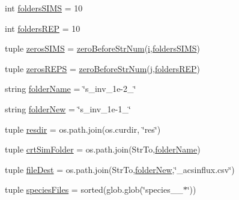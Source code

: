 \begin{DoxyCompactItemize}
\item 
int \hyperlink{namespacereset_for_new_simulations_a60b4005683b2bced2f3e0b22a66abd47}{folders\-S\-I\-M\-S} = 10
\item 
int \hyperlink{namespacereset_for_new_simulations_a3869e711bac998c005313abd611c6158}{folders\-R\-E\-P} = 10
\item 
tuple \hyperlink{namespacereset_for_new_simulations_a067f416fc59f243e38a0b8a40627979b}{zeros\-S\-I\-M\-S} = \hyperlink{namespacereset_for_new_simulations_aba1c55fe18d1a0b31b346994a7a96628}{zero\-Before\-Str\-Num}(\hyperlink{start_8m_ad3efca1ea6e3333daf30719ee0501862}{i},\hyperlink{namespacereset_for_new_simulations_a60b4005683b2bced2f3e0b22a66abd47}{folders\-S\-I\-M\-S})
\item 
tuple \hyperlink{namespacereset_for_new_simulations_a9f88ef39633f68b28f6b0e96d5ebb34c}{zeros\-R\-E\-P\-S} = \hyperlink{namespacereset_for_new_simulations_aba1c55fe18d1a0b31b346994a7a96628}{zero\-Before\-Str\-Num}(\hyperlink{inizializzatore___a_c_s_8m_ac86694252f8dfdb19aaeadc4b7c342c6}{j},\hyperlink{namespacereset_for_new_simulations_a3869e711bac998c005313abd611c6158}{folders\-R\-E\-P})
\item 
string \hyperlink{namespacereset_for_new_simulations_af9fbda1c8e6d13404f0224a5b3ef16fe}{folder\-Name} = \char`\"{}s\-\_\-inv\-\_\-1e-\/2\-\_\-\char`\"{}
\item 
string \hyperlink{namespacereset_for_new_simulations_adfad2b3e8459d644a442c254865c564b}{folder\-New} = \char`\"{}s\-\_\-inv\-\_\-1e-\/1\-\_\-\char`\"{}
\item 
tuple \hyperlink{namespacereset_for_new_simulations_addd72b08bf24570a2a851808a0b21949}{resdir} = os.\-path.\-join(os.\-curdir, \char`\"{}res\char`\"{})
\item 
tuple \hyperlink{namespacereset_for_new_simulations_ad71f20889e7a6394d3c15e5e9381394d}{crt\-Sim\-Folder} = os.\-path.\-join(Str\-To,\hyperlink{namespacereset_for_new_simulations_af9fbda1c8e6d13404f0224a5b3ef16fe}{folder\-Name})
\item 
tuple \hyperlink{namespacereset_for_new_simulations_a0fd24d58ef8ebf1029176f620ce7fe65}{file\-Dest} = os.\-path.\-join(Str\-To,\hyperlink{namespacereset_for_new_simulations_adfad2b3e8459d644a442c254865c564b}{folder\-New},\char`\"{}\-\_\-acsinflux.\-csv\char`\"{})
\item 
tuple \hyperlink{namespacereset_for_new_simulations_a876ddf603699b40992ad784167b1121e}{species\-Files} = sorted(glob.\-glob(\char`\"{}species\-\_\-\_\-$\ast$\char`\"{}))

\end{DoxyCompactItemize}
